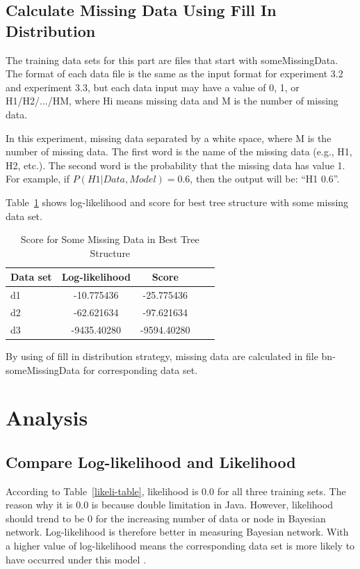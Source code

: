 \documentclass{article}
\begin{document}
\subsection{Calculate Missing Data Using Fill In Distribution}
The training data sets for this part are files that start with someMissingData. The format of each data file is the same as the input format for experiment 3.2 and experiment 3.3, but each data input may have a value of 0, 1, or H1/H2/.../HM, where Hi means missing data and M is the number of missing data. 

In this experiment, missing data separated by a white space, where M is the number of missing data. The first word is the name of the missing data (e.g., H1, H2, etc.). The second word is the probability that the missing data has value 1. For example, if $P(H1 | Data, Model) = 0.6$, then the output will be: “H1 0.6”.

Table~\ref{missing-data} shows log-likelihood and score for best tree structure with some missing data set.

\begin{table}[t]
\caption{Score for Some Missing Data in Best Tree Structure}
\label{missing-data}
\vskip 0.15in
\begin{center}
\begin{small}
\begin{sc}
\begin{tabular}{lcccr}
\hline
\abovespace\belowspace
Data set & Log-likelihood & Score \\
\hline
\abovespace
d1    & -10.775436 & -25.775436& \\
d2	  & -62.621634 & -97.621634& \\
d3    & -9435.40280 & -9594.40280&  \\
\hline
\end{tabular}
\end{sc}
\end{small}
\end{center}
\vskip -0.1in
\end{table}

By using of fill in distribution strategy, missing data are calculated in file bn-someMissingData for corresponding data set.

\section{Analysis}
\subsection{Compare Log-likelihood and Likelihood}
According to Table~\ref{likeli-table}, likelihood is 0.0 for all three training sets. The reason why it is 0.0 is because double limitation in Java. However, likelihood should trend to be 0 for the increasing number of data or node in Bayesian network. Log-likelihood is therefore better in measuring Bayesian network. With a higher value of log-likelihood means the corresponding data set is more likely to have occurred under this model .
\end{document}
